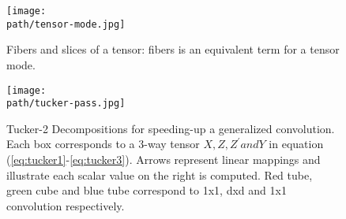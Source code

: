 \begin{figure}[h!]
 \centering
 \texttt{[image: \\path/tensor-mode.jpg]} 
 \caption{Fibers and slices of a tensor: fibers is an equivalent term for a tensor mode.}
 \label{fig:tensor-fibers}
\end{figure}

\begin{figure}[h!]
 \centering
 \texttt{[image: \\path/tucker-pass.jpg]} 
 \caption{Tucker-2  Decompositions  for  speeding-up  a generalized convolution. Each box corresponds to a 3-way tensor $X, Z, Z^' and Y$ in equation (\ref{eq:tucker1}-\ref{eq:tucker3}). Arrows represent linear mappings 
and illustrate each scalar value on the right is computed. Red tube, green cube and blue tube correspond to 
1x1, dxd and 1x1 convolution respectively.}
 \label{fig:tucker-pass}
\end{figure}





\begin{comment}
\begin{center}
\begin{align*}
	V(x, y, t) = \sum_i \sum_j \sum_s K(x-i, y-j, s, t)X(i, j, s) \\
		= \sum_r \sum_i \sum_j \sum_s K^x_r(x-i)K^y_r(y-i)K^s_r(s)K^t_r(t)X(i, j, s)\\
			= \sum_r K^t_r(t) \sum_i \sum_j K^x_r(x-i)K^y_r(y-i) \sum_s K^s_r(s) X(i, j, s) \tag{4}
\end{align*}
\end{center}
\end{comment}


